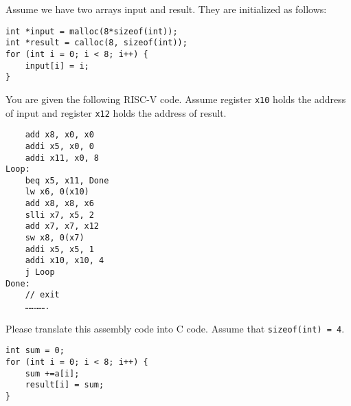 \begin{blocksection}
\question
Assume we have two arrays input and result. They are initialized as follows:

\begin{verbatim}
int *input = malloc(8*sizeof(int));
int *result = calloc(8, sizeof(int));
for (int i = 0; i < 8; i++) {
    input[i] = i;
}
\end{verbatim}

You are given the following RISC-V code. Assume register \lstinline$x10$ holds the address of input and register \lstinline$x12$ holds the address of result. 

\begin{verbatim}
    add x8, x0, x0
    addi x5, x0, 0
    addi x11, x0, 8
Loop:
    beq x5, x11, Done
    lw x6, 0(x10)
    add x8, x8, x6
    slli x7, x5, 2
    add x7, x7, x12
    sw x8, 0(x7)
    addi x5, x5, 1
    addi x10, x10, 4
    j Loop
Done:
    // exit
    ………….
\end{verbatim}

Please translate this assembly code into C code. Assume that \lstinline$sizeof(int) = 4$.

\begin{solution}[4in]
\begin{verbatim}
int sum = 0;
for (int i = 0; i < 8; i++) {
    sum +=a[i];
    result[i] = sum;
}
\end{verbatim}
\end{solution}
\end{blocksection}